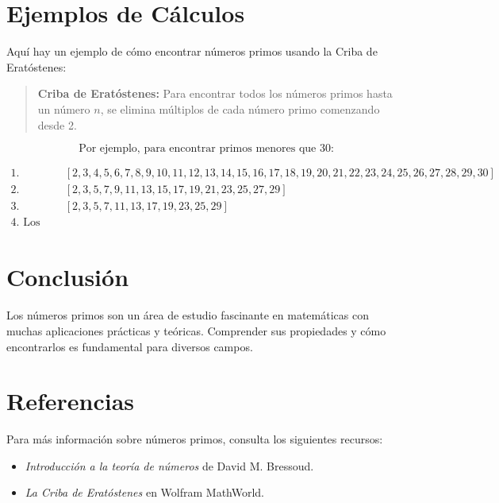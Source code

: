 \documentclass[a4paper,12pt]{article} %
\begin{document}
\section{Ejemplos de Cálculos}
Aquí hay un ejemplo de cómo encontrar números primos usando la Criba de Eratóstenes:

\begin{quote}
    \textbf{Criba de Eratóstenes:} Para encontrar todos los números primos hasta un número \( n \), se elimina múltiplos de cada número primo comenzando desde 2.
\end{quote}

\begin{equation}
    \text{Por ejemplo, para encontrar primos menores que 30:}
\end{equation}

\begin{align*}
    \text{1. Empieza con la lista } & [2, 3, 4, 5, 6, 7, 8, 9, 10, 11, 12, 13, 14, 15, 16, 17, 18, 19, 20, 21, 22, 23, 24, 25, 26, 27, 28, 29, 30] \\
    \text{2. Elimina múltiplos de 2:} & [2, 3, 5, 7, 9, 11, 13, 15, 17, 19, 21, 23, 25, 27, 29] \\
    \text{3. Elimina múltiplos de 3:} & [2, 3, 5, 7, 11, 13, 17, 19, 23, 25, 29] \\
    \text{4. Los números restantes son primos.}
\end{align*}

\section{Conclusión}
Los números primos son un área de estudio fascinante en matemáticas con muchas aplicaciones prácticas y teóricas. Comprender sus propiedades y cómo encontrarlos es fundamental para diversos campos.

\section{Referencias}
Para más información sobre números primos, consulta los siguientes recursos:

\begin{itemize}
    \item \textit{Introducción a la teoría de números} de David M. Bressoud.
    \item \textit{La Criba de Eratóstenes} en Wolfram MathWorld.
\end{itemize}
\end{document}
